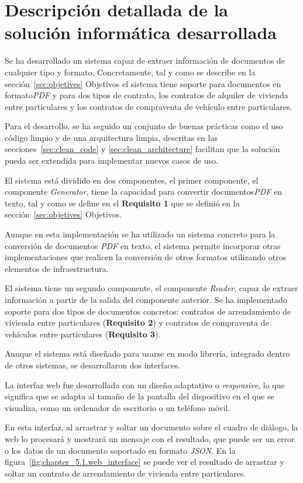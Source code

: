 \section{Descripción detallada de la solución informática desarrollada}

Se ha desarrollado un sistema capaz de extraer información de documentos de cualquier tipo y formato.
Concretamente, tal y como se describe en la sección~\ref{sec:objetives} Objetivos el sistema tiene soporte para
documentos en formato\textit{PDF} y para dos tipos de contrato, los contratos de alquiler de vivienda entre particulares
y los contratos de compraventa de vehículo entre particulares.

Para el desarrollo, se ha seguido un conjunto de buenas prácticas como el uso código limpio y de una arquitectura
limpia, descritas en las secciones~\ref{sec:clean_code} y \ref{sec:clean_architecture} facilitan que la solución
pueda ser extendida para implementar nuevos casos de uso.

El sistema está dividido en dos componentes, el primer componente, el componente \textit{Generator}, tiene la capacidad
para convertir documentos\textit{PDF} en texto, tal y como se define en el \textbf{Requisito 1} que se definió en la
sección~\ref{sec:objetives} Objetivos.

Aunque en esta implementación se ha utilizado un sistema concreto para la conversión de documentos \textit{PDF}
en texto, el sistema permite incorporar otras implementaciones que realicen la conversión de otros formatos utilizando
otros elementos de infraestructura.

El sistema tiene un segundo componente, el componente \textit{Reader}, capaz de extraer información a partir de la
salida del componente anterior.
Se ha implementado soporte para dos tipos de documentos concretos: contratos de arrendamiento de vivienda entre
particulares (\textbf{Requisito 2}) y contratos de compraventa de vehículos entre particulares (\textbf{Requisito 3}).

Aunque el sistema está diseñado para usarse en modo librería, integrado dentro de otros sistemas, se desarrollaron dos
interfaces.

La interfaz web fue desarrollada con un diseño adaptativo o \textit{responsive}, lo que significa que se adapta al
tamaño de la pantalla del dispositivo en el que se visualiza, como un ordenador de escritorio o un teléfono móvil.

En esta interfaz, al arrastrar y soltar un documento sobre el cuadro de diálogo, la web lo procesará y mostrará un
mensaje con el resultado, que puede ser un error o los datos de un documento soportado en formato \textit{JSON}.
En la figura~\ref{fig:chapter_5.1.web_interface} se puede ver el resultado de arrastrar y soltar un contrato de
arrendamiento de vivienda entre particulares.

